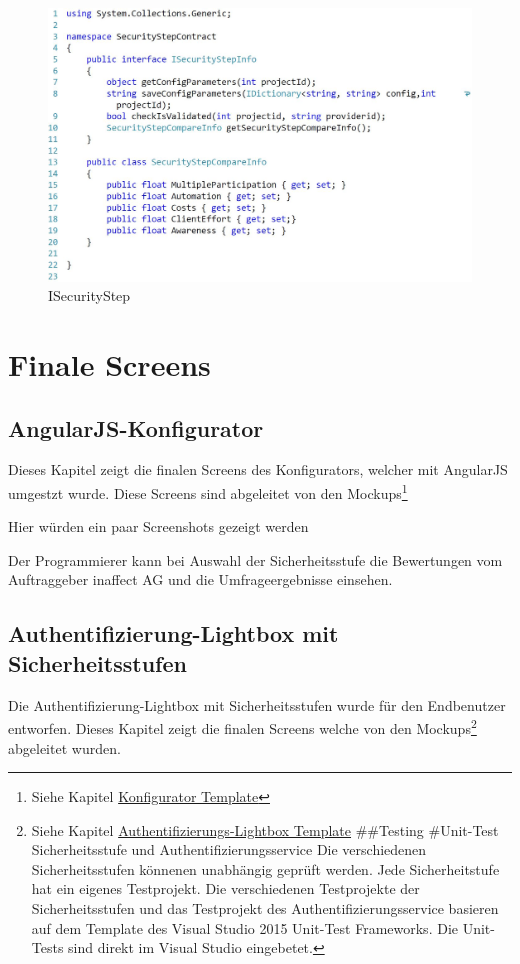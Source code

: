 \begin{figure}[htbp]
\centering
\includegraphics{images/code/ISecurityStep.jpg}
\caption{ISecurityStep}
\end{figure}

\section{Finale Screens}\label{finale-screens}

\subsection{AngularJS-Konfigurator}\label{angularjs-konfigurator}

Dieses Kapitel zeigt die finalen Screens des Konfigurators, welcher mit
AngularJS umgestzt wurde. Diese Screens sind abgeleitet von den
Mockups\footnote{Siehe Kapitel
  \protect\hyperlink{konfigurator-template}{Konfigurator Template}}

Hier würden ein paar Screenshots gezeigt werden

Der Programmierer kann bei Auswahl der Sicherheitsstufe die Bewertungen
vom Auftraggeber inaffect AG und die Umfrageergebnisse einsehen.

\subsection{Authentifizierung-Lightbox mit
Sicherheitsstufen}\label{authentifizierung-lightbox-mit-sicherheitsstufen}

Die Authentifizierung-Lightbox mit Sicherheitsstufen wurde für den
Endbenutzer entworfen. Dieses Kapitel zeigt die finalen Screens welche
von den Mockups\footnote{Siehe Kapitel
  \protect\hyperlink{authentifizierungs-lightbox-template}{Authentifizierungs-Lightbox
  Template} \#\#Testing \#Unit-Test Sicherheitsstufe und
  Authentifizierungsservice Die verschiedenen Sicherheitsstufen könnenen
  unabhängig geprüft werden. Jede Sicherheitstufe hat ein eigenes
  Testprojekt. Die verschiedenen Testprojekte der Sicherheitsstufen und
  das Testprojekt des Authentifizierungsservice basieren auf dem
  Template des Visual Studio 2015 Unit-Test Frameworks. Die Unit-Tests
  sind direkt im Visual Studio eingebetet.} abgeleitet wurden.


